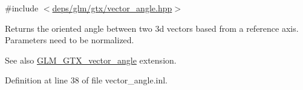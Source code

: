 {\ttfamily \#include $<$\hyperlink{vector__angle_8hpp}{deps/glm/gtx/vector\+\_\+angle.\+hpp}$>$}

Returns the oriented angle between two 3d vectors based from a reference axis. Parameters need to be normalized. \begin{DoxySeeAlso}{See also}
\hyperlink{group__gtx__vector__angle}{G\+L\+M\+\_\+\+G\+T\+X\+\_\+vector\+\_\+angle} extension. 
\end{DoxySeeAlso}


Definition at line 38 of file vector\+\_\+angle.\+inl.

